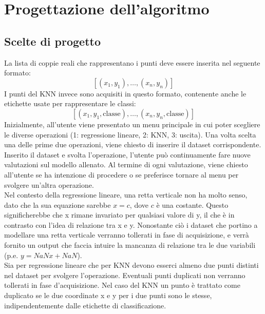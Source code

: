 \documentclass[11pt]{article}
\theoremstyle{definition}
\begin{document}
\newpage

\section{Progettazione dell'algoritmo}

\subsection{Scelte di progetto}
La lista di coppie reali che rappresentano i punti deve essere inserita nel seguente formato:
$$
[(x_1, y_1), \dots, (x_n, y_n)]
$$
I punti del KNN invece sono acquisiti in questo formato, contenente anche le etichette usate per rappresentare le classi:
$$
[(x_1, y_1, \text{classe}), \dots, (x_n, y_n, \text{classe})]
$$
Inizialmente, all'utente viene presentato un menu principale in cui poter scegliere le diverse operazioni (1: regressione lineare, 2: KNN, 3: uscita). Una volta scelta una delle prime due operazioni, viene chiesto di inserire il dataset corrispondente. Inserito il dataset e svolta l'operazione, l'utente può continuamente fare nuove valutazioni sul modello allenato. Al termine di ogni valutazione, viene chiesto all'utente se ha intenzione di procedere o se preferisce tornare al menu per svolgere un'altra operazione. \\
\newline
Nel contesto della regressione lineare, una retta verticale non ha molto senso, dato che la sua equazione sarebbe $x=c$, dove $c$ è una costante. Questo significherebbe che x rimane invariato per qualsiasi valore di y, il che è in contrasto con l'idea di relazione tra x e y. Nonostante ciò i dataset che portino a modellare una retta verticale verranno tollerati in fase di acquisizione, e verrà fornito un output che faccia intuire la mancanza di relazione tra le due variabili (p.e. $y=NaNx+NaN$). \\
\newline
Sia per regressione lineare che per KNN devono esserci almeno due punti distinti nel dataset per svolgere l'operazione. Eventuali punti duplicati non verranno tollerati in fase d'acquisizione. Nel caso del KNN un punto è trattato come duplicato se le due coordinate x e y per i due punti sono le stesse, indipendentemente dalle etichette di classificazione.
\end{document}
